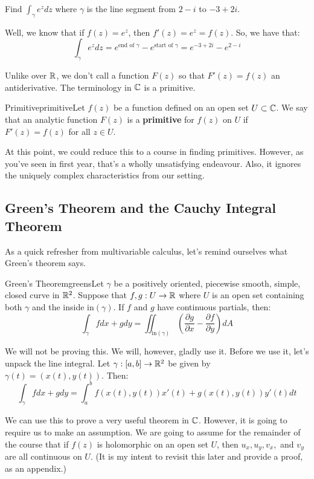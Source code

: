 \begin{ex}{}{} Find $\int_\gamma e^zdz$ where $\gamma$ is the line segment from $2 - i$ to $-3 + 2i$.

Well, we know that if $f(z) = e^z$, then $f'(z) = e^z = f(z)$. So, we have that:
$$\int_{\gamma} e^zdz = e^{\text{end of }\gamma} - e^{\text{start of }\gamma} = e^{-3 + 2i} - e^{2 - i}$$
\end{ex}

Unlike over $\mathbb{R}$, we don't call a function $F(z)$ so that $F'(z) = f(z)$ an antiderivative. The terminology in $\mathbb{C}$ is a primitive.

\begin{defbo}{Primitive}{primitive}Let $f(z)$ be a function defined on an open set $U \subset \mathbb{C}$. We say that an analytic function $F(z)$ is a {\bf primitive} for $f(z)$ on $U$ if $F'(z) = f(z)$ for all $z\in U$.
\end{defbo}

At this point, we could reduce this to a course in finding primitives. However, as you've seen in first year, that's a wholly unsatisfying endeavour. Also, it ignores the uniquely complex characteristics from our setting.

\subsection{Green's Theorem and the Cauchy Integral Theorem}

As a quick refresher from multivariable calculus, let's remind ourselves what Green's theorem says.

\begin{thmbo}{Green's Theorem}{greens}Let $\gamma$ be a positively oriented, piecewise smooth, simple, closed curve in $\mathbb{R}^2$. Suppose that $f,g:U\rightarrow \mathbb{R}$ where $U$ is an open set containing both $\gamma$ and the inside $\mathrm{in}(\gamma)$. If $f$ and $g$ have continuous partials, then:
$$\int_{\gamma} fdx + gdy = \iint_{\mathrm{in}(\gamma)} \left(\frac{\partial g}{\partial x} - \frac{\partial f}{\partial y}\right)dA$$
\end{thmbo}

We will not be proving this. We will, however, gladly use it. Before we use it, let's unpack the line integral. Let $\gamma:[a,b] \rightarrow \mathbb{R}^2$ be given by $\gamma(t) = (x(t),y(t))$. Then:
$$\int_{\gamma} fdx + gdy = \int_a^b f(x(t),y(t))x'(t) + g(x(t),y(t))y'(t)dt$$

We can use this to prove a very useful theorem in $\mathbb{C}$. However, it is going to require us to make an assumption. We are going to assume for the remainder of the course that if $f(z)$ is holomorphic on an open set $U$, then $u_x,u_y,v_x,$ and $v_y$ are all continuous on $U$. (It is my intent to revisit this later and provide a proof, as an appendix.)

